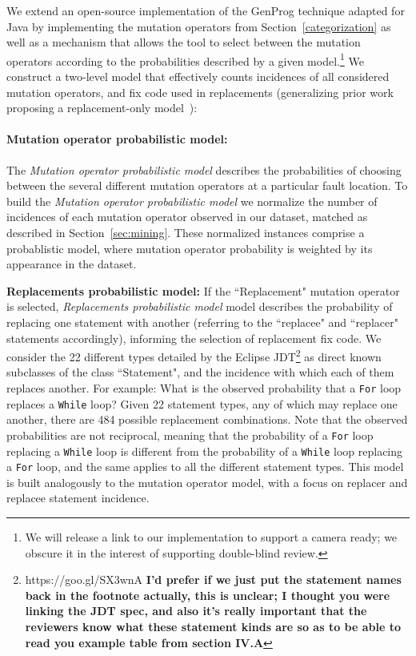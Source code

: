 \documentclass[conference]{IEEEtran}
\newcommand{\todo}[1]
  {{\scriptsize \textbf{\color{red} {#1}}}}
\begin{document}
We extend an open-source implementation of the GenProg technique adapted for Java
by implementing the mutation operators from
Section~\ref{categorization} as well as a mechanism that allows the tool to
select between the mutation operators according to the probabilities described by
a given model.\footnote{We will release a link to our implementation to support
  a camera ready; we obscure it in the interest of supporting double-blind
  review.}  We construct a two-level model that effectively counts incidences of all considered
mutation operators, and fix code used in replacements  (generalizing prior work
proposing a replacement-only model~\cite{Soto15}):

\paragraph{Mutation operator probabilistic model:}
The \textit{Mutation operator probabilistic model} 
describes the probabilities of choosing between the several different mutation 
operators at a particular fault location.
%
To build the \textit{Mutation operator probabilistic model} 
we normalize the number of incidences of each mutation operator observed in our
dataset, matched as described in Section~\ref{sec:mining}.  These normalized
instances comprise a probablistic model, where mutation operator probability is
weighted by its appearance in the dataset.  

\textbf{Replacements probabilistic model:}
If the ``Replacement" mutation operator is 
selected,  \textit{Replacements probabilistic model} model describes the probability of replacing one statement with
another  (referring to the 
``replacee" and ``replacer" statements accordingly), informing the selection of replacement fix code.
We consider 
the 22 different types detailed by the Eclipse
JDT\footnote{https://goo.gl/SX3wnA \label{stmtNames}\todo{I'd prefer if we just
    put the statement names back in the footnote actually, this is unclear; I
    thought you were linking the JDT spec, and also it's really important that
    the reviewers know what these statement kinds are so as to be able to read
    you example table from section IV.A}} as
direct known subclasses of the class ``Statement", and the incidence with which
each of  
them replaces another. For example: What is the observed probability that a \texttt{For} loop 
replaces a \texttt{While} loop? Given 22 statement types, any of which may replace one
another, there are 484 possible replacement combinations. 
Note that the observed probabilities are not reciprocal, meaning 
that the probability of a \texttt{For} loop replacing a \texttt{While} loop is different from the 
probability of a \texttt{While} loop replacing a \texttt{For} loop, and the same applies to all 
the different statement types.
This model is built analogously to the
mutation operator model, with a focus on replacer and replacee statement incidence.
\end{document}
